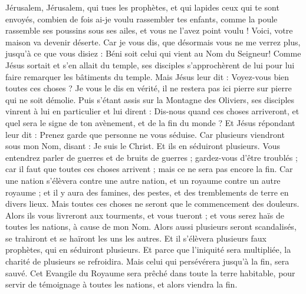 \begin{multicols}{2}
Jérusalem, Jérusalem, qui tues les prophètes, et qui lapides ceux qui te sont envoyés, combien de fois ai-je voulu rassembler tes enfants, comme la poule rassemble ses poussins sous ses ailes, et vous ne l'avez point voulu !
Voici, votre maison va devenir déserte.
Car je vous dis, que désormais vous ne me verrez plus, jusqu'à ce que vous disiez : Béni soit celui qui vient au Nom du Seigneur!
\VerseOne{}Comme Jésus sortait et s'en allait du temple, ses disciples s'approchèrent de lui pour lui faire remarquer les bâtiments du temple.
Mais Jésus leur dit : Voyez-vous bien toutes ces choses ? Je vous le dis en vérité, il ne restera pas ici pierre sur pierre qui ne soit démolie.
Puis s'étant assis sur la Montagne des Oliviers, ses disciples vinrent à lui en particulier et lui dirent : Dis-nous quand ces choses arriveront, et quel sera le signe de ton avènement, et de la fin du monde ?
Et Jésus répondant leur dit : Prenez garde que personne ne vous séduise.
Car plusieurs viendront sous mon Nom, disant : Je suis le Christ. Et ils en séduiront plusieurs.
Vous entendrez parler de guerres et de bruits de guerres ; gardez-vous d'être troublés ; car il faut que toutes ces choses arrivent ; mais ce ne sera pas encore la fin.
Car une nation s'élèvera contre une autre nation, et un royaume contre un autre royaume ; et il y aura des famines, des pestes, et des tremblements de terre en divers lieux.
Mais toutes ces choses ne seront que le commencement des douleurs.
Alors ils vous livreront aux tourments, et vous tueront ; et vous serez haïs de toutes les nations, à cause de mon Nom.
Alors aussi plusieurs seront scandalisés, se trahiront et se haïront les uns les autres.
Et il s'élèvera plusieurs faux prophètes, qui en séduiront plusieurs.
Et parce que l'iniquité sera multipliée, la charité de plusieurs se refroidira.
Mais celui qui persévérera jusqu'à la fin, sera sauvé.
Cet Evangile du Royaume sera prêché dans toute la terre habitable, pour servir de témoignage à toutes les nations, et alors viendra la fin.

\end{multicols}
